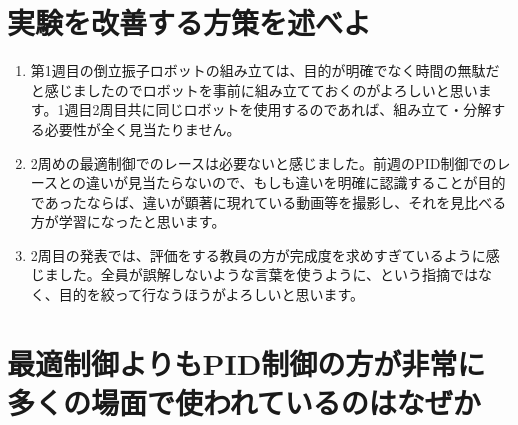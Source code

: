 \documentclass[a4j,twoside,openright,11pt]{jarticle}
\begin{document}
\section{実験を改善する方策を述べよ}
\begin{enumerate}
\item 第1週目の倒立振子ロボットの組み立ては、目的が明確でなく時間の無駄だと感じましたのでロボットを事前に組み立てておくのがよろしいと思います。1週目2周目共に同じロボットを使用するのであれば、組み立て・分解する必要性が全く見当たりません。
\item 2周めの最適制御でのレースは必要ないと感じました。前週のPID制御でのレースとの違いが見当たらないので、もしも違いを明確に認識することが目的であったならば、違いが顕著に現れている動画等を撮影し、それを見比べる方が学習になったと思います。
\item 2周目の発表では、評価をする教員の方が完成度を求めすぎているように感じました。全員が誤解しないような言葉を使うように、という指摘ではなく、目的を絞って行なうほうがよろしいと思います。
\end{enumerate}
\section{最適制御よりもPID制御の方が非常に多くの場面で使われているのはなぜか}
\end{document}
